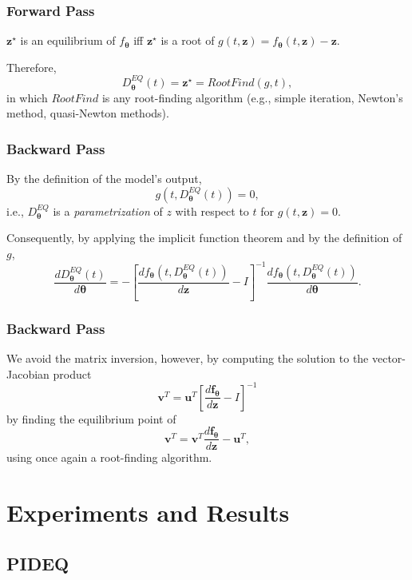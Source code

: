 \documentclass[t]{beamer}
\begin{document}
\begin{frame}
    \frametitle{Forward Pass}
    $\bm{z}^{\star}$ is an equilibrium of $f_{\bm{\theta}}$ iff $\bm{z}^{\star}$ is a root of $g(t,\bm{z}) = f_{\bm{\theta}}(t,\bm{z}) - \bm{z}$.
    \linebreak \pause

    Therefore, \[
    D^{EQ}_{\bm{\theta}}(t) = \bm{z}^{\star} = RootFind(g,t)
    ,\] in which $RootFind$ is any root-finding algorithm (e.g., simple iteration, Newton's method, quasi-Newton methods).
\end{frame}

\begin{frame}
    \frametitle{Backward Pass}
    By the definition of the model's output, \[
	g(t,D^{EQ}_{\bm{\theta}}(t)) = 0
    ,\] i.e., $D^{EQ}_{\bm{\theta}}$ is a \emph{parametrization} of $z$ with respect to $t$ for $g(t,\bm{z})=0$.
    \linebreak \pause

    Consequently, by applying the implicit function theorem \cite{Bai2019} and by the definition of $g$, \[
	\frac{d D^{EQ}_{\bm{\theta}}(t)}{d \bm{\theta}} = - \left[ \frac{d f_{\bm{\theta}}(t,D^{EQ}_{\bm{\theta}}(t))}{d \bm{z}} - I \right]^{-1} \frac{d f_{\bm{\theta}}(t,D^{EQ}_{\bm{\theta}}(t))}{d \bm{\theta}}
    .\] 
\end{frame}

\begin{frame}
    \frametitle{Backward Pass}
    We avoid the matrix inversion, however, by computing the solution to the vector-Jacobian product \[
    \bm{v}^T = \bm{u}^T\left[ \frac{d \bm{f}_{\bm{\theta}}}{d \bm{z}} - I \right]^{-1}
    \] by finding the equilibrium point of \[
    \bm{v}^T = \bm{v}^T \frac{d \bm{f}_{\bm{\theta}}}{d \bm{z}} - \bm{u}^T
    ,\] using once again a root-finding algorithm.
    
\end{frame}

\section{Experiments and Results}

\subsection{PIDEQ}
\end{document}

